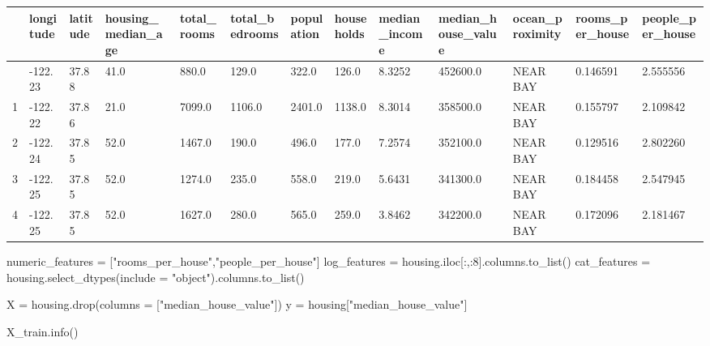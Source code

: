 \documentclass[
  letterpaper,
  DIV=11,
  numbers=noendperiod]{scrartcl}
\newenvironment{Shaded}{\begin{snugshade}}{\end{snugshade}}
\newcommand{\DecValTok}[1]{\textcolor[rgb]{0.68,0.00,0.00}{#1}}
\newcommand{\NormalTok}[1]{\textcolor[rgb]{0.00,0.23,0.31}{#1}}
\newcommand{\OperatorTok}[1]{\textcolor[rgb]{0.37,0.37,0.37}{#1}}
\newcommand{\StringTok}[1]{\textcolor[rgb]{0.13,0.47,0.30}{#1}}
\begin{document}
\begin{longtable}[]{@{}lllllllllllll@{}}
\toprule\noalign{}
& longitude & latitude & housing\_median\_age & total\_rooms &
total\_bedrooms & population & households & median\_income &
median\_house\_value & ocean\_proximity & rooms\_per\_house &
people\_per\_house \\
\midrule\noalign{}
\endhead
\bottomrule\noalign{}
\endlastfoot
0 & -122.23 & 37.88 & 41.0 & 880.0 & 129.0 & 322.0 & 126.0 & 8.3252 &
452600.0 & NEAR BAY & 0.146591 & 2.555556 \\
1 & -122.22 & 37.86 & 21.0 & 7099.0 & 1106.0 & 2401.0 & 1138.0 & 8.3014
& 358500.0 & NEAR BAY & 0.155797 & 2.109842 \\
2 & -122.24 & 37.85 & 52.0 & 1467.0 & 190.0 & 496.0 & 177.0 & 7.2574 &
352100.0 & NEAR BAY & 0.129516 & 2.802260 \\
3 & -122.25 & 37.85 & 52.0 & 1274.0 & 235.0 & 558.0 & 219.0 & 5.6431 &
341300.0 & NEAR BAY & 0.184458 & 2.547945 \\
4 & -122.25 & 37.85 & 52.0 & 1627.0 & 280.0 & 565.0 & 259.0 & 3.8462 &
342200.0 & NEAR BAY & 0.172096 & 2.181467 \\
\end{longtable}

\begin{Shaded}
\begin{Highlighting}[]
\NormalTok{numeric\_features }\OperatorTok{=}\NormalTok{ [}\StringTok{"rooms\_per\_house"}\NormalTok{,}\StringTok{"people\_per\_house"}\NormalTok{]}
\NormalTok{log\_features }\OperatorTok{=}\NormalTok{ housing.iloc[:,:}\DecValTok{8}\NormalTok{].columns.to\_list()}
\NormalTok{cat\_features }\OperatorTok{=}\NormalTok{ housing.select\_dtypes(include }\OperatorTok{=} \StringTok{"object"}\NormalTok{).columns.to\_list()}
\end{Highlighting}
\end{Shaded}

\begin{Shaded}
\begin{Highlighting}[]
\NormalTok{X }\OperatorTok{=}\NormalTok{ housing.drop(columns }\OperatorTok{=}\NormalTok{ [}\StringTok{"median\_house\_value"}\NormalTok{])}
\NormalTok{y }\OperatorTok{=}\NormalTok{ housing[}\StringTok{"median\_house\_value"}\NormalTok{]}
\end{Highlighting}
\end{Shaded}

\begin{Shaded}
\begin{Highlighting}[]
\NormalTok{X\_train.info()}
\end{Highlighting}
\end{Shaded}
\end{document}
